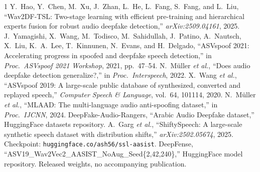 \documentclass[conference]{IEEEtran}
\begin{document}
{\begin{thebibliography}{1}
 Y.~Hao, Y.~Chen, M.~Xu, J.~Zhan, L.~He, L.~Fang, S.~Fang,
and L.~Liu, ``Wav2DF-TSL: Two-stage learning with efficient pre-training and
hierarchical experts fusion for robust audio deepfake detection,''
\emph{arXiv:2509.04161}, 2025.
 J.~Yamagishi, X.~Wang, M.~Todisco, M.~Sahidullah,
J.~Patino, A.~Nautsch, X.~Liu, K.~A.~Lee, T.~Kinnunen, N.~Evans, and
H.~Delgado, ``ASVspoof 2021: Accelerating progress in spoofed and deepfake
speech detection,'' in \emph{Proc.\ ASVspoof 2021 Workshop}, 2021, pp.\ 47--54.
 N.~M\"uller \emph{et al.}, ``Does audio deepfake detection
generalize?,'' in \emph{Proc.\ Interspeech}, 2022.
 X.~Wang \emph{et al.}, ``ASVspoof 2019: A large-scale
public database of synthesized, converted and replayed speech,'' \emph{Computer
Speech \& Language}, vol.\ 64, 101114, 2020.
 N.~M\"uller \emph{et al.}, ``MLAAD: The multi-language audio
anti-spoofing dataset,'' in \emph{Proc.\ IJCNN}, 2024.
 DeepFake-Audio-Rangers, ``Arabic Audio Deepfake dataset,''
HuggingFace datasets repository.
 A.~Garg \emph{et al.}, ``ShiftySpeech: A large-scale
synthetic speech dataset with distribution shifts,'' \emph{arXiv:2502.05674},
2025. Checkpoint: \texttt{huggingface.co/ash56/ssl-aasist}.
 DeepFense, ``ASV19\_\-Wav2Vec2\_\-AASIST\_\-NoAug\_\-Seed\{2,42,240\},''
HuggingFace model repository. Released weights, no accompanying publication.
\end{thebibliography}}
\end{document}
